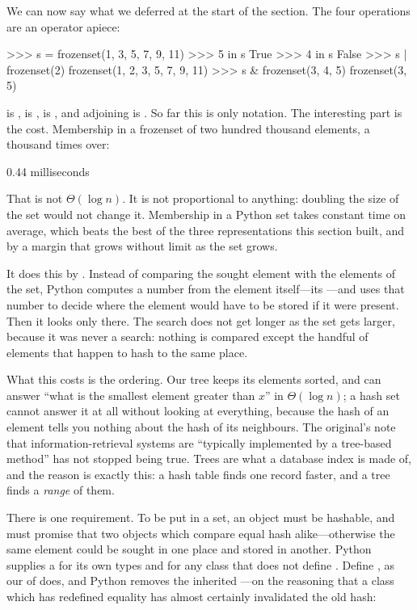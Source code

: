 \begin{revealTheSurface}
We can now say what we deferred at the start of the section.  The four
operations are an operator apiece:

\begin{codeBlock}
>>> s = frozenset({1, 3, 5, 7, 9, 11})
>>> 5 in s
True
>>> 4 in s
False
>>> s | frozenset({2})
frozenset({1, 2, 3, 5, 7, 9, 11})
>>> s & frozenset({3, 4, 5})
frozenset({3, 5})
\end{codeBlock}

\noindent
{} is , \code{|} is ,
\code{\&} is , and adjoining is
.  So far this is only notation.  The interesting
part is the cost.  Membership in a frozenset of two hundred thousand elements,
a thousand times over:

\begin{codeBlock}
0.44 milliseconds
\end{codeBlock}

\noindent
That is not \( \Theta(\log n) \).  It is not proportional to anything: doubling
the size of the set would not change it.  Membership in a Python set takes
constant time on average, which beats the best of the three representations
this section built, and by a margin that grows without limit as the set grows.

It does this by .  Instead of comparing the sought element
with the elements of the set, Python computes a number from the element
itself---its ---and uses that number to decide where the element
would have to be stored if it were present.  Then it looks only there.  The
search does not get longer as the set gets larger, because it was never a
search: nothing is compared except the handful of elements that happen to hash
to the same place.

What this costs is the ordering.  Our tree keeps its elements sorted, and can
answer ``what is the smallest element greater than \( x \)'' in
\( \Theta(\log n) \); a hash set cannot answer it at all without looking at
everything, because the hash of an element tells you nothing about the hash of
its neighbours.  The original's note that information-retrieval systems are
``typically implemented by a tree-based method'' has not stopped being true.
Trees are what a database index is made of, and the reason is exactly this: a
hash table finds one record faster, and a tree finds a \emph{range} of them.

There is one requirement.  To be put in a set, an object must be hashable, and
must promise that two objects which compare equal hash alike---otherwise the
same element could be sought in one place and stored in another.  Python
supplies a  for its own types and for any class that does
not define .  Define , as our 
of  does, and Python removes the inherited
---on the reasoning that a class which has redefined
equality has almost certainly invalidated the old hash:


\end{revealTheSurface}
